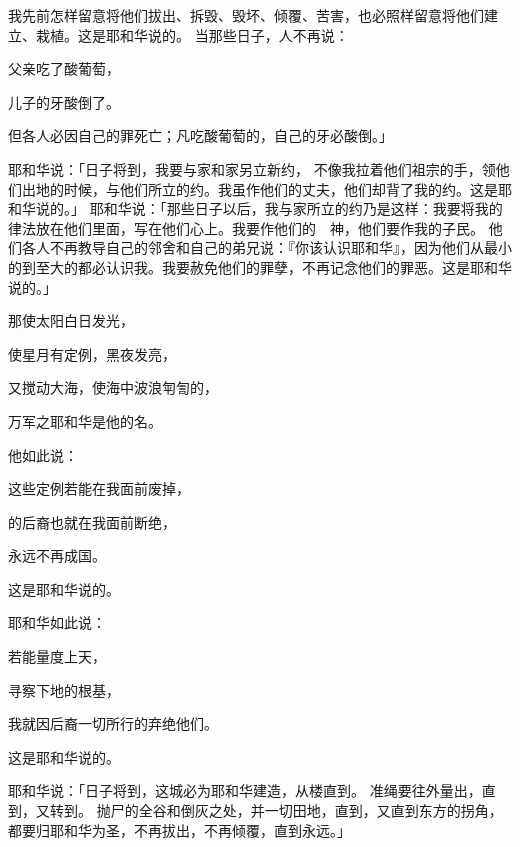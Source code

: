 {我先前怎样留意将他们拔出、拆毁、毁坏、倾覆、苦害，也必照样留意将他们建立、栽植。这是耶和华说的。
当那些日子，人不再说：
\par }{\Q 父亲吃了酸葡萄，
\par }{\Q 儿子的牙酸倒了。
\par }{\MM {}但各人必因自己的罪死亡；凡吃酸葡萄的，自己的牙必酸倒。」
\par }{\PP {}耶和华说：「日子将到，我要与{}家和{}家另立新约，
不像我拉着他们祖宗的手，领他们出{}地的时候，与他们所立的约。我虽作他们的丈夫，他们却背了我的约。这是耶和华说的。」
耶和华说：「那些日子以后，我与{}家所立的约乃是这样：我要将我的律法放在他们里面，写在他们心上。我要作他们的　神，他们要作我的子民。
他们各人不再教导自己的邻舍和自己的弟兄说：『你该认识耶和华』，因为他们从最小的到至大的都必认识我。我要赦免他们的罪孽，不再记念他们的罪恶。这是耶和华说的。」
\par }{\Q {}那使太阳白日发光，
\par }{\Q 使星月有定例，黑夜发亮，
\par }{\Q 又搅动大海，使海中波浪匉訇的，
\par }{\Q 万军之耶和华是他的名。
\par }{\Q 他如此说：
\par }{\Q {}这些定例若能在我面前废掉，
\par }{的后裔也就在我面前断绝，
\par }{\Q 永远不再成国。
\par }{\Q 这是耶和华说的。
\par }{\BB \par }{\PP {}耶和华如此说：
\par }{\Q 若能量度上天，
\par }{\Q 寻察下地的根基，
\par }{\Q 我就因{}后裔一切所行的弃绝他们。
\par }{\Q 这是耶和华说的。
\par }{\PP {}耶和华说：「日子将到，这城必为耶和华建造，从{}楼直到{}。
准绳要往外量出，直到{}，又转到{}。
抛尸的全谷和倒灰之处，并一切田地，直到{}，又直到东方{}的拐角，都要归耶和华为圣，不再拔出，不再倾覆，直到永远。」

}
